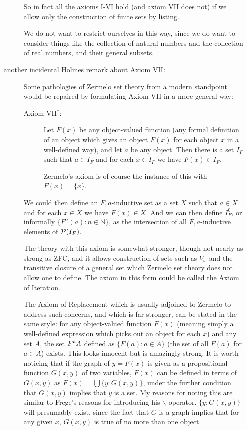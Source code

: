 \documentclass[12pt]{article}
\begin{document}
\begin{enumerate}
\begin{description}
\begin{enumerate}
\end{enumerate}



So in fact all the axioms I-VI hold (and axiom VII does not) if we allow only the construction of finite sets by listing.

We do not want to restrict ourselves in this way, since we do want to consider things like the collection of natural numbers and the collection of real numbers, and their general subsets.

\item[another incidental Holmes remark about Axiom VII:]  Some pathologies of Zermelo set theory from a modern standpoint would be repaired by formulating Axiom VII in a more general way: 

\begin{description}

\item[Axiom VII$^*$:]  Let $F(x)$ be any object-valued function (any formal definition of an object which gives an object $F(x)$ for each object $x$ in a well-defined way), and let $a$ be any object.  Then there is a set
$I_F$ such that $a \in I_F$ and for each $x \in I_F$ we have $F(x) \in I_F$. 

 Zermelo's axiom is of course the instance of this with $F(x) = \{x\}$.\end{description}

We could then define an $F,a$-inductive set as a set $X$ such that $a \in X$ and for each $x \in X$ we have $F(x) \in X$.  And we can then define $I_F^0$, or informally $\{F^n(a):n \in {\mathbb N}\}$, as
the intersection of all $F,a$-inductive elements of ${\cal P}(I_F)$.

The theory with this axiom is somewhat stronger, though not nearly as strong as ZFC, and it allows construction of sets such as $V_{\omega}$ and the transitive closure of a general set which Zermelo set theory does not allow one to define.   The axiom in this form could be called the Axiom of Iteration.

The Axiom of Replacement which is usually adjoined to Zermelo to address such concerns, and which is far stronger, can be stated in the same style:  for any object-valued function
$F(x)$ (meaning simply a well-defined expression which picks out an object for each $x$) and any set $A$, the set $F``A$ defined as $\{F(a):a \in A\}$ (the set of all $F(a)$ for $a \in A$) exists.  This looks innocent but is amazingly strong.  It is worth noticing that if the graph of $y = F(x)$ is given as a propositional function $G(x,y)$ of two variables, $F(x)$ can
be defined in terms of $G(x,y)$ as $F(x) = \bigcup \{y:G(x,y)\}$, under the further condition that $G(x,y)$ implies that $y$ is a set.  My reasons for noting this are similar to Frege's reasons for introducing his $\backslash$ operator. $\{y:G(x,y)\}$ will presumably exist, since the fact that $G$ is a graph implies that for any given $x$, $G(x,y)$ is true of no more than one object.


\end{description}
\end{enumerate}
\end{document}
